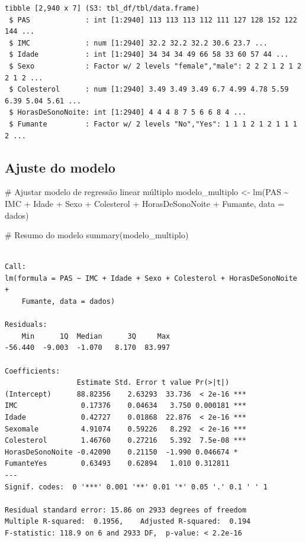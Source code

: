 \documentclass[
  letterpaper,
  DIV=11,
  numbers=noendperiod]{scrartcl}
\newenvironment{Shaded}{\begin{snugshade}}{\end{snugshade}}
\newcommand{\AttributeTok}[1]{\textcolor[rgb]{0.40,0.45,0.13}{#1}}
\newcommand{\CommentTok}[1]{\textcolor[rgb]{0.37,0.37,0.37}{#1}}
\newcommand{\FunctionTok}[1]{\textcolor[rgb]{0.28,0.35,0.67}{#1}}
\newcommand{\NormalTok}[1]{\textcolor[rgb]{0.00,0.23,0.31}{#1}}
\newcommand{\OtherTok}[1]{\textcolor[rgb]{0.00,0.23,0.31}{#1}}
\newcommand{\SpecialCharTok}[1]{\textcolor[rgb]{0.37,0.37,0.37}{#1}}
\begin{document}
\begin{verbatim}
tibble [2,940 x 7] (S3: tbl_df/tbl/data.frame)
 $ PAS             : int [1:2940] 113 113 113 112 111 127 128 152 122 144 ...
 $ IMC             : num [1:2940] 32.2 32.2 32.2 30.6 23.7 ...
 $ Idade           : int [1:2940] 34 34 34 49 66 58 33 60 57 44 ...
 $ Sexo            : Factor w/ 2 levels "female","male": 2 2 2 1 2 1 2 2 1 2 ...
 $ Colesterol      : num [1:2940] 3.49 3.49 3.49 6.7 4.99 4.78 5.59 6.39 5.04 5.61 ...
 $ HorasDeSonoNoite: int [1:2940] 4 4 4 8 7 5 6 6 8 4 ...
 $ Fumante         : Factor w/ 2 levels "No","Yes": 1 1 1 2 1 2 1 1 1 2 ...
\end{verbatim}

\subsection{Ajuste do modelo}\label{ajuste-do-modelo}

\begin{Shaded}
\begin{Highlighting}[]
\CommentTok{\# Ajustar modelo de regressão linear múltiplo}
\NormalTok{modelo\_multiplo }\OtherTok{\textless{}{-}} \FunctionTok{lm}\NormalTok{(PAS }\SpecialCharTok{\textasciitilde{}}\NormalTok{ IMC }\SpecialCharTok{+}\NormalTok{ Idade }\SpecialCharTok{+}\NormalTok{ Sexo }\SpecialCharTok{+}\NormalTok{ Colesterol }\SpecialCharTok{+}\NormalTok{ HorasDeSonoNoite }\SpecialCharTok{+}\NormalTok{ Fumante, }\AttributeTok{data =}\NormalTok{ dados)}

\CommentTok{\# Resumo do modelo}
\FunctionTok{summary}\NormalTok{(modelo\_multiplo)}
\end{Highlighting}
\end{Shaded}

\begin{verbatim}

Call:
lm(formula = PAS ~ IMC + Idade + Sexo + Colesterol + HorasDeSonoNoite + 
    Fumante, data = dados)

Residuals:
    Min      1Q  Median      3Q     Max 
-56.440  -9.003  -1.070   8.170  83.997 

Coefficients:
                 Estimate Std. Error t value Pr(>|t|)    
(Intercept)      88.82356    2.63293  33.736  < 2e-16 ***
IMC               0.17376    0.04634   3.750 0.000181 ***
Idade             0.42727    0.01868  22.876  < 2e-16 ***
Sexomale          4.91074    0.59226   8.292  < 2e-16 ***
Colesterol        1.46760    0.27216   5.392  7.5e-08 ***
HorasDeSonoNoite -0.42090    0.21150  -1.990 0.046674 *  
FumanteYes        0.63493    0.62894   1.010 0.312811    
---
Signif. codes:  0 '***' 0.001 '**' 0.01 '*' 0.05 '.' 0.1 ' ' 1

Residual standard error: 15.86 on 2933 degrees of freedom
Multiple R-squared:  0.1956,    Adjusted R-squared:  0.194 
F-statistic: 118.9 on 6 and 2933 DF,  p-value: < 2.2e-16
\end{verbatim}
\end{document}
